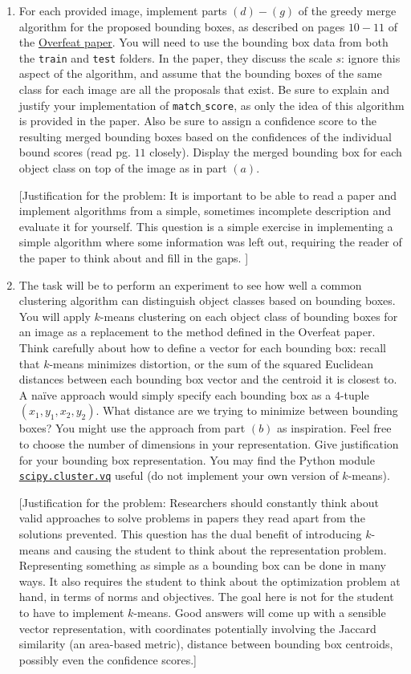 \documentclass[12pt]{article}
\begin{document}
\begin{enumerate}
\item For each provided image, implement parts $(d)-(g)$ of the greedy merge algorithm for the proposed bounding boxes, as described on pages $10-11$ of the \href{http://arxiv.org/pdf/1312.6229v4.pdf}{Overfeat paper}. You will need to use the bounding box data from both the \texttt{train} and \texttt{test} folders. In the paper, they discuss the scale $s$: ignore this aspect of the algorithm, and assume that the bounding boxes of the same class for each image are all the proposals that exist. Be sure to explain and justify your implementation of \texttt{match$\_$score}, as only the idea of this algorithm is provided in the paper. Also be sure to assign a confidence score to the resulting merged bounding boxes based on the confidences of the individual bound scores (read pg. $11$ closely). Display the merged bounding box for each object class on top of the image as in part $(a)$.

[Justification for the problem: It is important to be able to read a paper and implement algorithms from a simple, sometimes incomplete description and evaluate it for yourself. This question is a simple exercise in implementing a simple algorithm where some information was left out, requiring the reader of the paper to think about and fill in the gaps. ]

\item The task will be to perform an experiment to see how well a common clustering algorithm can distinguish object classes based on bounding boxes. You will apply $k$-means clustering on each object class of bounding boxes for an image as a replacement to the method defined in the Overfeat paper. Think carefully about how to define a vector for each bounding box: recall that $k$-means minimizes distortion, or the sum of the squared Euclidean distances between each bounding box vector and the centroid it is closest to. A na{\"i}ve approach would simply specify each bounding box as a $4$-tuple $(x_1, y_1, x_2, y_2)$. What distance are we trying to minimize between bounding boxes? You might use the approach from part $(b)$ as inspiration. Feel free to choose the number of dimensions in your representation. Give justification for your bounding box representation. You may find the Python module \href{http://docs.scipy.org/doc/scipy/reference/cluster.vq.html}{\texttt{scipy.cluster.vq}} useful (do not implement your own version of $k$-means).

[Justification for the problem: Researchers should constantly think about valid approaches to solve problems in papers they read apart from the solutions prevented. This question has the dual benefit of introducing $k$-means and causing the student to think about the representation problem. Representing something as simple as a bounding box can be done in many ways. It also requires the student to think about the optimization problem at hand, in terms of norms and objectives. The goal here is not for the student to have to implement $k$-means. Good answers will come up with a sensible vector representation, with coordinates potentially involving the Jaccard similarity (an area-based metric), distance between bounding box centroids, possibly even the confidence scores.]


\end{enumerate}
\end{document}
